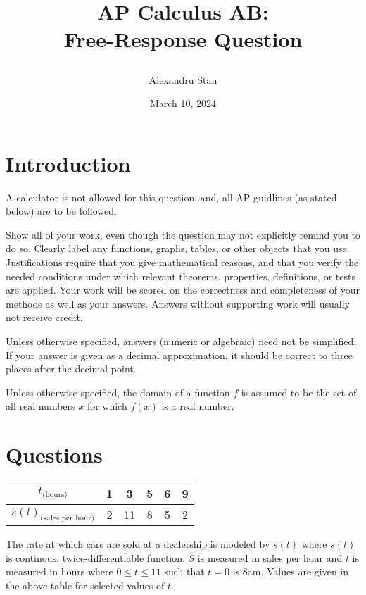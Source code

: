 \documentclass{article}
\title{
    \textbf{AP Calculus AB: \\Free-Response Question}
    \author{Alexandru Stan}
    \date{March 10, 2024}
}
\begin{document}
    \maketitle
    \vfill
    \newpage

    \section*{Introduction}

    A calculator is not allowed for this question, and, all AP guidlines (as stated below) 
    are to be followed. 

    Show all of your work, even though the question may not explicitly remind you to do so. Clearly label any
    functions, graphs, tables, or other objects that you use. Justifications require that you give mathematical reasons,
    and that you verify the needed conditions under which relevant theorems, properties, definitions, or tests are
    applied. Your work will be scored on the correctness and completeness of your methods as well as your answers.
    Answers without supporting work will usually not receive credit.

    Unless otherwise specified, answers (numeric or algebraic) need not be simplified. If your answer is given as a
    decimal approximation, it should be correct to three places after the decimal point.

    Unless otherwise specified, the domain of a function $f$ is assumed to be the set of all real numbers $x$ for which
    $f(x)$ is a real number.

    \section*{Questions}

    \begin{table}[h]
        \def\arraystretch{2}
        \begin{tabular}{|c|c|c|c|c|c|}
            \hline
            $t_{\text{(hours)}}$ & 1 & 3 & 5 & 6 & 9 \\
            \hline
            $s(t)_{\text{(sales per hour)}}$ & 2 & 11 & 8 & 5 & 2 \\
            \hline 
        \end{tabular}
    \end{table} 

    The rate at which cars are sold at a dealership is modeled by $s(t)$ where $s(t)$ is continous, twice-differentiable function.
    $S$ is measured in sales per hour and $t$ is measured in hours where $0 \le t \le 11$ such that
    $t = 0$ is 8am. Values are given in the above table for selected values of $t$.
\end{document}
